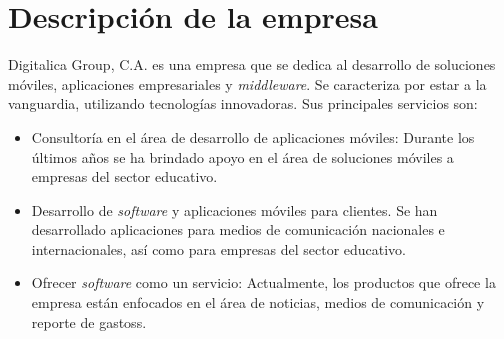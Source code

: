 \section{Descripción de la empresa} \label{Descripcion de la empresa}

Digitalica Group, C.A. es una empresa que se dedica al desarrollo de soluciones móviles, aplicaciones empresariales y \textit{middleware}. Se caracteriza por estar a la vanguardia, utilizando tecnologías innovadoras\cite{DIG1}. Sus principales servicios son:

\begin{itemize}
\item Consultoría en el área de desarrollo de aplicaciones móviles: Durante los últimos años se ha brindado apoyo en el área de soluciones móviles a empresas del sector educativo.
\item Desarrollo de \textit{software} y aplicaciones móviles para clientes. Se han desarrollado aplicaciones para medios de comunicación nacionales e internacionales, así como para empresas del sector educativo.
\item Ofrecer \textit{software} como un servicio: Actualmente, los productos que ofrece la empresa están enfocados en el área de noticias, medios de comunicación y reporte de gastoss. 
\end{itemize}
